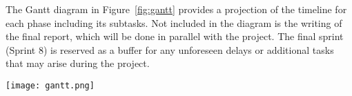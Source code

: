 \documentclass[english]{hogent-article}
\begin{document}
The Gantt diagram in Figure~\ref{fig:gantt} provides a projection of the timeline for each phase including its subtasks.
Not included in the diagram is the writing of the final report, which will be done in parallel with the project.
The final sprint (Sprint 8) is reserved as a buffer for any unforeseen delays or additional tasks that may arise during the project.

\begin{figure*}
  \centering
  \texttt{[image: gantt.png]}
  \caption{\label{fig:gantt}Gantt diagram of the research phases and milestones for each sprint.}
\end{figure*}









\printbibliography[heading=bibintoc]
\end{document}
